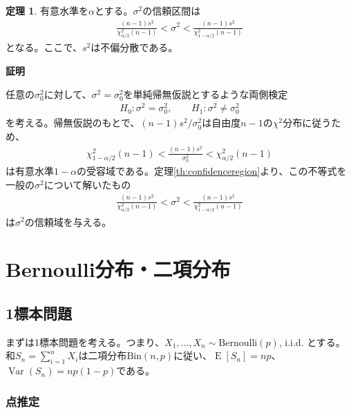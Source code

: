 \documentclass[11pt]{ltjsarticle}
\makeatletter
\theoremstyle{definition}
\newtheorem{theorem}{定理}[section]
\DeclareMathOperator{\E}{E}
\DeclareMathOperator{\Var}{Var}
\renewenvironment{proof}[1][証明]{\par
  \pushQED{\qed}%
  \normalfont \topsep6\p@\@plus6\p@\relax
  \trivlist
  \item\relax
  {\bfseries
  #1\@addpunct{.}}\hspace\labelsep\ignorespaces
}{%
  \popQED\endtrivlist\@endpefalse
}
\makeatother
\begin{document}
\begin{theorem}
    有意水準を$\alpha$とする。$\sigma^2$の信頼区間は
    \begin{align}
        \frac{(n-1)s^2}{\chi^2_{\alpha/2}(n-1)} < \sigma^2 < \frac{(n-1)s^2}{\chi^2_{1-\alpha/2}(n-1)}
    \end{align}
    となる。ここで、$s^2$は不偏分散である。
\end{theorem}
\begin{proof}
    任意の$\sigma_0^2$に対して、$\sigma^2=\sigma^2_0$を単純帰無仮説とするような両側検定
    \begin{align}\label{sigmatest}
            H_0: \sigma^2=\sigma^2_0,\qquad H_1: \sigma^2\neq \sigma^2_0
    \end{align}
    を考える。帰無仮説のもとで、$(n-1)s^2/\sigma_0^2$は自由度$n-1$の$\chi^2$分布に従うため、
    \begin{align}
        \chi_{1-\alpha/2}^2(n-1) < \frac{(n-1)s^2}{\sigma_0^2} < \chi_{\alpha/2}^2(n-1)
    \end{align}
    は有意水準$1-\alpha$の受容域である。定理\ref{th:confidenceregion}より、この不等式を一般の$\sigma^2$について解いたもの
    \begin{align}
        \frac{(n-1)s^2}{\chi^2_{\alpha/2}(n-1)} < \sigma^2 < \frac{(n-1)s^2}{\chi^2_{1-\alpha/2}(n-1)}
    \end{align}
    は$\sigma^2$の信頼域を与える。
\end{proof}

\section{Bernoulli分布・二項分布}
\subsection{1標本問題}
まずは1標本問題を考える。つまり、$X_1,\ldots, X_n\sim \text{Bernoulli}(p)$, i.i.d. とする。和$S_n=\sum_{i=1}^nX_i$は二項分布$\text{Bin}(n, p)$に従い、$\E[S_n]=np$、$\Var(S_n)=np(1-p)$である。
\subsubsection{点推定}
\end{document}
